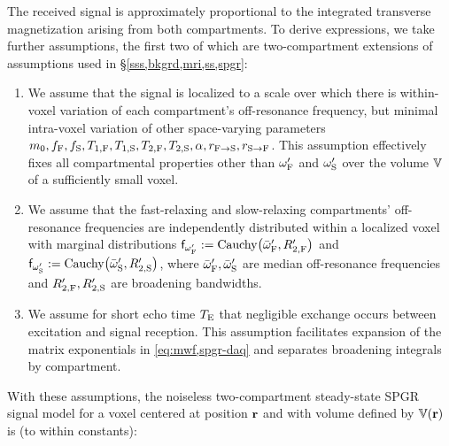 The received signal
is approximately proportional
to the integrated transverse magnetization
arising from both compartments.
To derive expressions,
we take further assumptions,
the first two of which are two-compartment extensions 
of assumptions used 
in \S\ref{sss,bkgrd,mri,ss,spgr}: 
\begin{enumerate}
	\item
		We assume
		that the signal is localized
		to a scale over which 
		there is within-voxel variation
		of each compartment's off-resonance frequency,
		but minimal intra-voxel variation
		of other space-varying parameters
		$m_0, f_{\mathrm{F}}, f_{\mathrm{S}}, T_{1,\mathrm{F}}, T_{1,\mathrm{S}}, T_{2,\mathrm{F}}, T_{2,\mathrm{S}}, \alpha, r_{\mathrm{F}\to\mathrm{S}}, r_{\mathrm{S}\to\mathrm{F}}$.
		This assumption effectively fixes all compartmental properties 
		other than $\omega'_{\mathrm{F}}$ and $\omega'_{\mathrm{S}}$
		over the volume $\mathbb{V}$ of a sufficiently small voxel.
		\label{item:spgr,int}
		
	\item 
		We assume 
		that the fast-relaxing
		and slow-relaxing compartments' off-resonance frequencies	
		are independently distributed 
		within a localized voxel 
		with marginal distributions
		$\dist{\ompf} := \operatorname{Cauchy}\paren{\ompfmed,\Rtpf}$
		and $\dist{\omps} := \operatorname{Cauchy}\paren{\ompsmed,\Rtps}$,
		where $\bar{\omega}_{\mathrm{F}}',\bar{\omega}_{\mathrm{S}}'$ are median off-resonance frequencies
		and $R_{2,\mathrm{F}}',R_{2,\mathrm{S}}'$ are broadening bandwidths.
		\label{item:spgr,freq}
		
	\item 
		We assume 
		for short echo time $T_\mathrm{E}$
		that negligible exchange occurs
		between excitation and signal reception.
		This assumption facilitates expansion 
		of the matrix exponentials
		in \eqref{eq:mwf,spgr-daq}
		and separates broadening integrals 
		by compartment.
		\label{item:spgr,exchg0}
\end{enumerate}
With these assumptions,
the noiseless two-compartment steady-state SPGR signal model
for a voxel
centered at position $\mathbf{r}$ 
and with volume defined by $\setV\pr$ 
is (to within constants):
